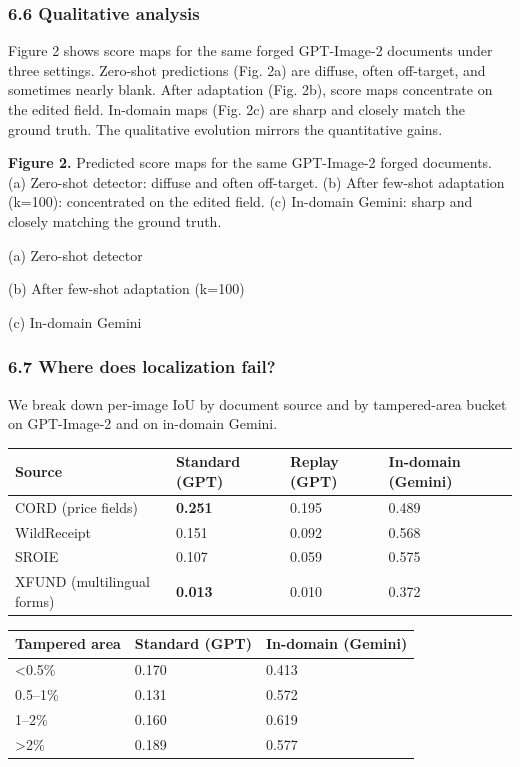 \subsubsection{6.6 Qualitative analysis}\label{qualitative-analysis}

Figure 2 shows score maps for the same forged GPT-Image-2 documents under three settings. Zero-shot predictions (Fig. 2a) are diffuse, often off-target, and sometimes nearly blank. After adaptation (Fig. 2b), score maps concentrate on the edited field. In-domain maps (Fig. 2c) are sharp and closely match the ground truth. The qualitative evolution mirrors the quantitative gains.

\textbf{Figure 2.} Predicted score maps for the same GPT-Image-2 forged documents. (a) Zero-shot detector: diffuse and often off-target. (b) After few-shot adaptation (k=100): concentrated on the edited field. (c) In-domain Gemini: sharp and closely matching the ground truth.

(a) Zero-shot detector

(b) After few-shot adaptation (k=100)

(c) In-domain Gemini

\subsubsection{6.7 Where does localization fail?}\label{where-does-localization-fail}

We break down per-image IoU by document source and by tampered-area bucket on GPT-Image-2 and on in-domain Gemini.

{\def\LTcaptype{none} %
\begin{longtable}[]{@{}llll@{}}
\toprule\noalign{}
Source & Standard (GPT) & Replay (GPT) & In-domain (Gemini) \\
\midrule\noalign{}
\endhead
\bottomrule\noalign{}
\endlastfoot
CORD (price fields) & \textbf{0.251} & 0.195 & 0.489 \\
WildReceipt & 0.151 & 0.092 & 0.568 \\
SROIE & 0.107 & 0.059 & 0.575 \\
XFUND (multilingual forms) & \textbf{0.013} & 0.010 & 0.372 \\
\end{longtable}
}

{\def\LTcaptype{none} %
\begin{longtable}[]{@{}lll@{}}
\toprule\noalign{}
Tampered area & Standard (GPT) & In-domain (Gemini) \\
\midrule\noalign{}
\endhead
\bottomrule\noalign{}
\endlastfoot
\textless0.5\% & 0.170 & 0.413 \\
0.5--1\% & 0.131 & 0.572 \\
1--2\% & 0.160 & 0.619 \\
\textgreater2\% & 0.189 & 0.577 \\
\end{longtable}
}

